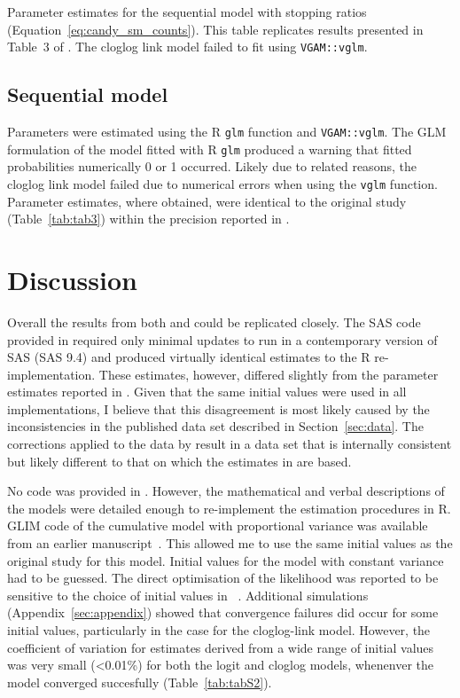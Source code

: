 \begin{table}[htb]
  \small
    \centering
    \caption{Parameter estimates for the sequential model with stopping ratios (Equation~\ref{eq:candy_sm_counts}). 
    This table replicates results presented in Table~3 of \citep{candy1991modeling}. 
    The cloglog link model failed to fit using \texttt{VGAM::vglm}.}
  
  \label{tab:tab3}
\end{table}

\subsection{Sequential model}
\label{sec:sm-results}
Parameters were estimated using the R \verb+glm+ function and \verb+VGAM::vglm+. 
The GLM formulation of the model fitted with R \verb+glm+ produced a warning that fitted probabilities numerically 0 or 1 occurred. 
Likely due to related reasons, the cloglog link model failed due to numerical errors when using the \verb+vglm+ function. 
Parameter estimates, where obtained, were identical to the original study (Table~\ref{tab:tab3}) within the precision reported in \citep{candy1991modeling}.

\section{Discussion}
Overall the results from both \citep{dennis1986stochastic} and \citep{candy1991modeling} could be replicated closely.
The SAS code provided in \citep{dennis1986stochastic} required only minimal updates to run in a contemporary version of SAS (SAS 9.4) and produced virtually identical estimates to the R re-implementation. 
These estimates, however, differed slightly from the parameter estimates reported in \citep{kemp1986stochastic}. 
Given that the same initial values were used in all implementations, I believe that this disagreement is most likely caused by the inconsistencies in the published data set described in Section~\ref{sec:data}. 
The corrections applied to the data by \citep{candy1991modeling} result in a data set that is internally consistent but likely different to that on which the estimates in \citep{kemp1986stochastic} are based.  

No code was provided in \citep{candy1991modeling}. 
However, the mathematical and verbal descriptions of the models were detailed enough to re-implement the estimation procedures in R. 
GLIM code of the cumulative model with proportional variance was available from an earlier manuscript~\citep{candy1990biology}. 
This allowed me to use the same initial values as the original study for this model. 
Initial values for the model with constant variance had to be guessed.
The direct optimisation of the likelihood was reported to be sensitive to the choice of initial values in ~\citep{dennis1986stochastic}. 
Additional simulations (Appendix~\ref{sec:appendix}) showed that convergence failures did occur for some initial values, particularly in the case for the cloglog-link model.
However, the coefficient of variation for estimates derived from a wide range of initial values was very small (<0.01\%) for both the logit and cloglog models, whenenver the model converged succesfully (Table~\ref{tab:tabS2}).

